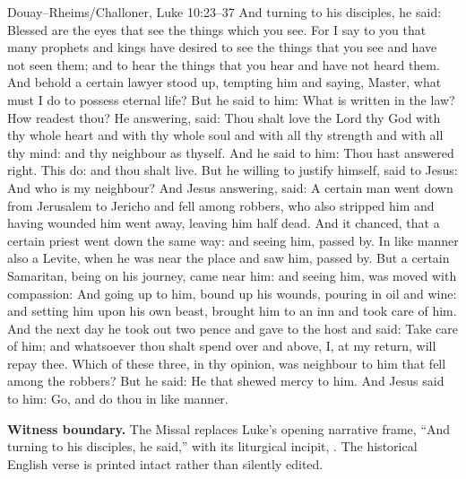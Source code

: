 \begin{namedtranslation}{Douay--Rheims/Challoner, Luke 10:23--37}
And turning to his disciples, he said: Blessed are the eyes that see the things
which you see. For I say to you that many prophets and kings have desired to
see the things that you see and have not seen them; and to hear the things
that you hear and have not heard them. And behold a certain lawyer stood up,
tempting him and saying, Master, what must I do to possess eternal life? But he
said to him: What is written in the law? How readest thou? He answering, said:
Thou shalt love the Lord thy God with thy whole heart and with thy whole soul
and with all thy strength and with all thy mind: and thy neighbour as thyself.
And he said to him: Thou hast answered right. This do: and thou shalt live. But
he willing to justify himself, said to Jesus: And who is my neighbour? And
Jesus answering, said: A certain man went down from Jerusalem to Jericho and
fell among robbers, who also stripped him and having wounded him went away,
leaving him half dead. And it chanced, that a certain priest went down the same
way: and seeing him, passed by. In like manner also a Levite, when he was near
the place and saw him, passed by. But a certain Samaritan, being on his
journey, came near him: and seeing him, was moved with compassion: And going
up to him, bound up his wounds, pouring in oil and wine: and setting him upon
his own beast, brought him to an inn and took care of him. And the next day he
took out two pence and gave to the host and said: Take care of him; and
whatsoever thou shalt spend over and above, I, at my return, will repay thee.
Which of these three, in thy opinion, was neighbour to him that fell among the
robbers? But he said: He that shewed mercy to him. And Jesus said to him: Go,
and do thou in like manner.

\textbf{Witness boundary.} The Missal replaces Luke's opening narrative
frame, ``And turning to his disciples, he said,'' with its liturgical incipit,
. The historical English
verse is printed intact rather than silently edited.
\end{namedtranslation}

\elementguard
